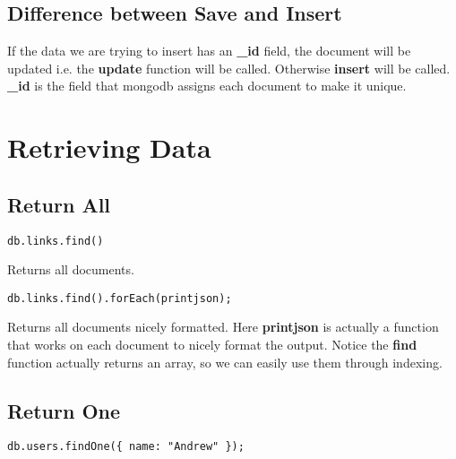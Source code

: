\documentclass[a4paper, 12pt]{article}
\begin{document}
\subsection{Difference between Save and Insert}
If the data we are trying to insert has an \textbf{\_id} field, the document will be updated i.e. the \textbf{update} function will be called. Otherwise \textbf{insert} will be called. \textbf{\_id} is the field that mongodb assigns each document to make it unique.

\section{Retrieving Data}
\subsection{Return All}
\begin{verbatim}
db.links.find()
\end{verbatim}
Returns all documents.
\begin{verbatim}
db.links.find().forEach(printjson);
\end{verbatim}
Returns all documents nicely formatted. Here \textbf{printjson} is actually a function that works on each document to nicely format the output. Notice the \textbf{find} function actually returns an array, so we can easily use them through indexing.
\subsection{Return One}
\begin{verbatim}
db.users.findOne({ name: "Andrew" });
\end{verbatim}

\end{document}
